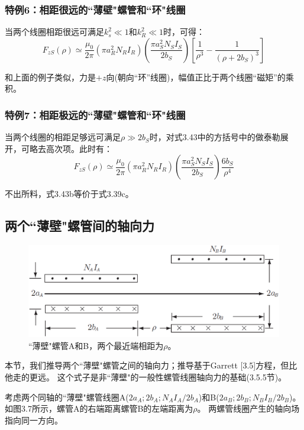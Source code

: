 \subsubsection{特例6：相距很远的``薄壁"螺管和``环"线圈}
当两个线圈相距很远可满足$k_s^2\ll 1$和$k_R^2\ll 1$时，可得：
\begin{equation}
F_{zS}(\rho)\simeq \frac{\mu_0}{2\pi}\left(\pi a_R^2N_R I_R\right)(\frac{\pi a_S^2 N_S I_S}{2 b_S})\left[\frac{1}{\rho^3}-\frac{1}{(\rho+2b_S)^3}\right]
\end{equation}

和上面的例子类似，力是$+z$向(朝向``环''线圈)，幅值正比于两个线圈``磁矩''的乘积。

\subsubsection{特例7：相距极远的``薄壁"螺管和``环"线圈}
当两个线圈的相距足够远可满足$\rho \gg 2b_S$时，对式3.43中的方括号中的做泰勒展开，可略去高次项。此时有：
\begin{equation*}
F_{zS}(\rho)\simeq\frac{\mu_0}{2\pi}(\pi a_R^2 N_R I_R)\left(\frac{\pi a_S^2 N_S I_S}{2 b_S}\right)\frac{6b_S}{\rho^4} \tag{3.43b}
\end{equation*}

不出所料，式3.43b等价于式3.39c。

\subsection{两个``薄壁"螺管间的轴向力}
\begin{figure}[htbp]
  \centering
 \includegraphics[scale=0.4]{chpt3/figs/fig3.7.eps}
  \caption{``薄壁"螺管A和B，两个最近端相距为$\rho$。}
\end{figure}

本节，我们推导两个``薄壁"螺管之间的轴向力；推导基于Garrett [3.5]方程，但比他走的更远。
这个式子是非``薄壁"的一般性螺管线圈轴向力的基础(3.5.5节)。

考虑两个同轴的``薄壁"螺管线圈A($2a_A; 2b_A; N_A I_A/2b_A$)和B($2a_B; 2b_B;
N_B I_B/2b_B$)。如图3.7所示，螺管A的右端距离螺管B的左端距离为$\rho$。
两螺管线圈产生的轴向场指向同一方向。

